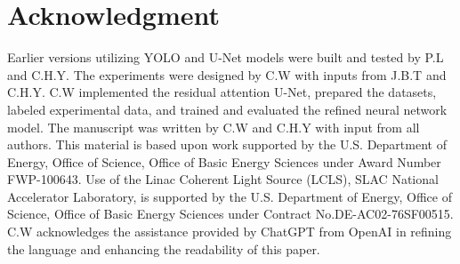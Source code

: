 \documentclass[a4paper]{article}
\begin{document}
\section*{Acknowledgment}

Earlier versions utilizing YOLO and U-Net models were built and tested by P.L and C.H.Y.  The experiments were designed by C.W with inputs from J.B.T and C.H.Y.  C.W implemented the residual attention U-Net, prepared the datasets, labeled experimental data, and trained and evaluated the refined neural network model.  The manuscript was written by C.W and C.H.Y with input from all authors.  This material is based upon work supported by the U.S.  Department of Energy, Office of Science, Office of Basic Energy Sciences under Award Number FWP-100643.  Use of the Linac Coherent Light Source (LCLS), SLAC National Accelerator Laboratory, is supported by the U.S.  Department of Energy, Office of Science, Office of Basic Energy Sciences under Contract No.DE-AC02-76SF00515.  C.W acknowledges the assistance provided by ChatGPT from OpenAI in refining the language and enhancing the readability of this paper.




\end{document}
